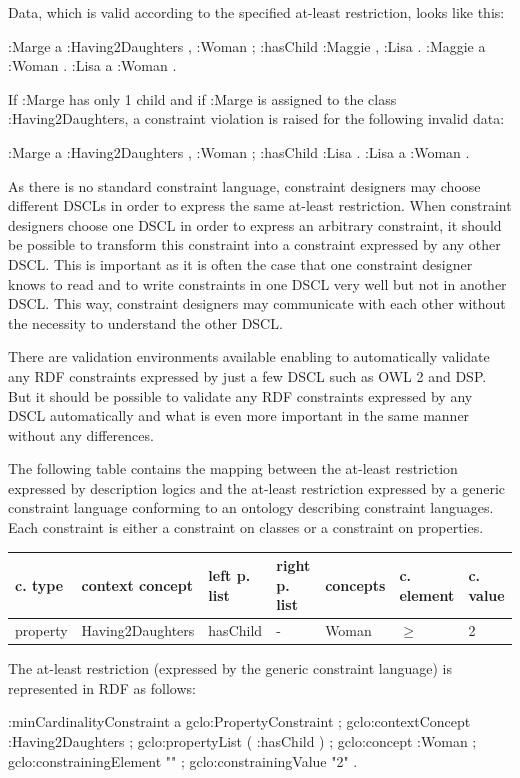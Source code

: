 \documentclass{llncs}
\newenvironment{gcotable}{
  \scriptsize
  \sffamily
  \vspace{0.3cm}
  \begin{tabular}{l|l|l|l|l|l|l}
  \hline
  \textbf{c. type} & \textbf{context concept} & \textbf{left p. list} & \textbf{right p. list} & \textbf{concepts} & \textbf{c. element} & \textbf{c. value} \\
  \hline

}{
  \hline
  \end{tabular}
  \linebreak
}
\begin{document}
Data, which is valid according to the specified at-least restriction, looks like this:

\begin{ex}
:Marge
    a :Having2Daughters , :Woman ;
    :hasChild :Maggie , :Lisa .
:Maggie
    a :Woman .
:Lisa
    a :Woman .
\end{ex}

If :Marge has only 1 child and if :Marge is assigned to the class :Having2Daughters, a constraint violation is raised for the following invalid data:

\begin{ex}
:Marge
    a :Having2Daughters , :Woman ;
    :hasChild :Lisa .
:Lisa
    a :Woman .
\end{ex}

As there is no standard constraint language, constraint designers may choose different DSCLs in order to express the same at-least restriction. 
When constraint designers choose one DSCL in order to express an arbitrary constraint, it should be possible to transform this constraint into a constraint expressed by any other DSCL. 
This is important as it is often the case that one constraint designer knows to read and to write constraints in one DSCL very well but not in another DSCL. 
This way, constraint designers may communicate with each other without the necessity to understand the other DSCL.

There are validation environments available enabling to automatically validate any RDF constraints expressed by just a few DSCL such as OWL 2 and DSP.
But it should be possible to validate any RDF constraints expressed by any DSCL automatically and what is even more important in the same manner without any differences.  

The following table contains the mapping between the at-least restriction expressed by description logics and the at-least restriction expressed by a generic constraint language conforming to an ontology describing constraint languages.
Each constraint is either a constraint on classes or a constraint on properties.

\begin{gcotable}
property & Having2Daughters & hasChild & - & Woman & $\geq$ & 2 \\
\end{gcotable}


The at-least restriction (expressed by the generic constraint language) is represented in RDF as follows:

\begin{ex}
:minCardinalityConstraint
    a gclo:PropertyConstraint ;
    gclo:contextConcept :Having2Daughters ;
    gclo:propertyList ( :hasChild ) ;
    gclo:concept :Woman ;
    gclo:constrainingElement "\geq" ;
    gclo:constrainingValue "2" .
\end{ex}
\end{document}
